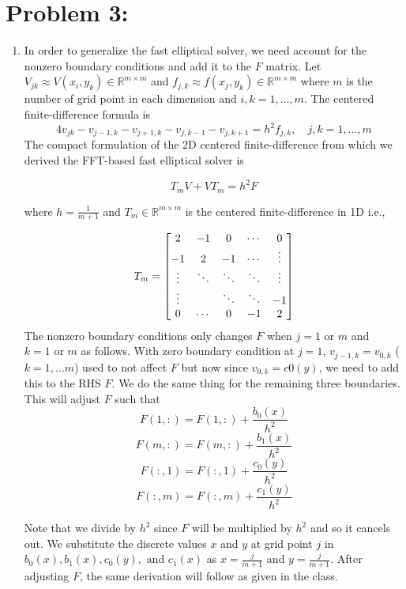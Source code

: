 \newpage
\section*{Problem 3:}
\begin{enumerate}
\item In order to generalize the fast elliptical solver, we need account for the nonzero boundary conditions and add it to the $F$ matrix. Let $V_{jk} \approx V(x_{i}, y_{k}) \in \mathbb{R}^{m\times m}$ and $f_{j,k} \approx f(x_{j}, y_{k}) \in \mathbb{R}^{m\times m}$ where $m$ is the number of grid point in each dimension and $i,k = 1, \dots, m$. The centered finite-difference formula is 
$$
4 v_{jk} - v_{j-1,k} - v_{j+1,k} - v_{j, k-1} - v_{j,k+1} = h^{2}f_{j,k}, \quad j,k=1, \dots, m
$$
The compact formulation of the 2D centered finite-difference from which we derived the FFT-based fast elliptical solver is 

$$
T_{m}V + VT_{m} = h^{2}F
$$

where $h=\frac{1}{m+1}$ and $T_{m}\in \mathbb{R}^{m\times m}$ is the centered finite-difference in 1D i.e., 

$$
T_{m} = 
\setcounter{MaxMatrixCols}{11}
\begin{bmatrix}
2 & -1& 0 & \cdots & 0\\
-1& 2 & -1& \cdots  & \vdots\\
\vdots & \ddots & \ddots & \ddots & \vdots\\
\vdots &   & \ddots & \ddots & -1\\
0 & \cdots & 0 & -1 & 2\\
\end{bmatrix}
$$
The nonzero boundary conditions only changes $F$  when $j=1 \text{\ or\ } m$ and $k=1 \text{\ or\ } m$ as follows. With zero boundary condition at $j=1$, $v_{j-1,k} = v_{0,k}$ ($k=1, \dots m $) used to not affect $F$ but now since $v_{0,k} = c0(y)$, we need to add this to the RHS $F$. We do the same thing for the remaining three boundaries. This will adjust $F$ such that 
$$F(1,:) = F(1,:) + \frac{b_{0}(x)}{h^{2}}$$
$$F(m,:) = F(m,:) + \frac{b_{1}(x)}{h^{2}}$$
$$F(:,1) = F(:,1) + \frac{c_{0}(y)}{h^{2}}$$
$$F(:,m) = F(:,m) + \frac{c_{1}(y)}{h^{2}}$$

Note that we divide by $h^{2}$ since $F$ will be multiplied by $h^{2}$ and so it cancels out. We substitute the discrete values $x$ and $y$ at grid point $j$ in $b_{0}(x), b_{1}(x), c_{0}(y),\text{\ and \ } c_{1}(x)$ as $x= \frac{j}{m+1}$ and $y= \frac{j}{m+1}$. After adjusting $F$, the same derivation will follow as given in the class. 


\end{enumerate}
